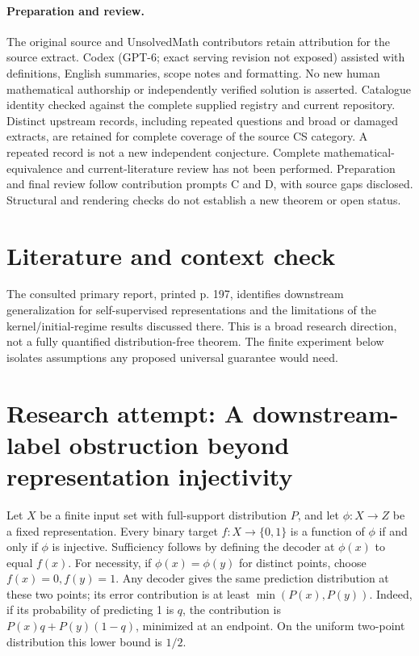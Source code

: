 \documentclass[11pt]{article}
\begin{document}
\paragraph{Preparation and review.}
The original source and UnsolvedMath contributors retain attribution for the source extract. Codex (GPT-6; exact serving revision not exposed) assisted with definitions, English summaries, scope notes and formatting. No new human mathematical authorship or independently verified solution is asserted. Catalogue identity checked against the complete supplied registry and current repository. Distinct upstream records, including repeated questions and broad or damaged extracts, are retained for complete coverage of the source CS category. A repeated record is not a new independent conjecture. Complete mathematical-equivalence and current-literature review has not been performed. Preparation and final review follow contribution prompts C and D, with source gaps disclosed. Structural and rendering checks do not establish a new theorem or open status.
\label{end:statement}

\section{Literature and context check}
The consulted primary report, printed p. 197, identifies downstream generalization for self-supervised representations and the limitations of the kernel/initial-regime results discussed there. This is a broad research direction, not a fully quantified distribution-free theorem. The finite experiment below isolates assumptions any proposed universal guarantee would need.
\section{Research attempt: A downstream-label obstruction beyond representation injectivity}

Let $X$ be a finite input set with full-support distribution $P$, and let $\phi:X\to Z$ be a fixed representation. Every binary target $f:X\to\{0,1\}$ is a function of $\phi$ if and only if $\phi$ is injective. Sufficiency follows by defining the decoder at $\phi(x)$ to equal $f(x)$. For necessity, if $\phi(x)=\phi(y)$ for distinct points, choose $f(x)=0,f(y)=1$. Any decoder gives the same prediction distribution at these two points; its error contribution is at least $\min(P(x),P(y))$. Indeed, if its probability of predicting 1 is $q$, the contribution is $P(x)q+P(y)(1-q)$, minimized at an endpoint. On the uniform two-point distribution this lower bound is $1/2$.
\end{document}
